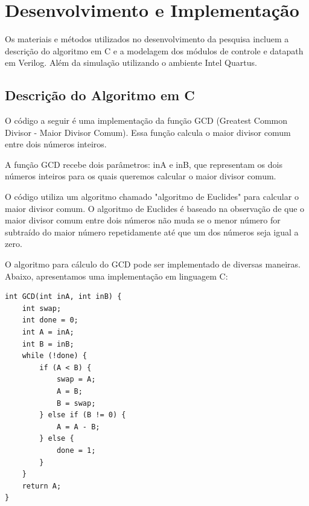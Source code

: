 \documentclass[a4paper,11pt]{article} %
\begin{document}
\clearpage
\section{Desenvolvimento e Implementação}

Os materiais e métodos utilizados no desenvolvimento da pesquisa
incluem a descrição do algoritmo em C e
a modelagem dos módulos de controle e datapath em Verilog.
Além da simulação utilizando o ambiente Intel Quartus.

\subsection{Descrição do Algoritmo em C}

O código a seguir é uma implementação da função GCD (Greatest Common Divisor - Maior Divisor Comum).
Essa função calcula o maior divisor comum entre dois números inteiros.

A função GCD recebe dois parâmetros: inA e inB,
que representam os dois números inteiros para os quais
queremos calcular o maior divisor comum.

O código utiliza um algoritmo chamado "algoritmo de Euclides"
para calcular o maior divisor comum.
O algoritmo de Euclides é baseado na observação de que
o maior divisor comum entre dois números não muda
se o menor número for subtraído do maior número repetidamente
até que um dos números seja igual a zero.

O algoritmo para cálculo do GCD pode ser implementado de diversas maneiras.
Abaixo, apresentamos uma implementação em linguagem C:

\begin{verbatim}
int GCD(int inA, int inB) {
    int swap;
    int done = 0;
    int A = inA;
    int B = inB;
    while (!done) {
        if (A < B) {
            swap = A;
            A = B;
            B = swap;
        } else if (B != 0) {
            A = A - B;
        } else {
            done = 1;
        }
    }
    return A;
}
\end{verbatim}
\end{document}
